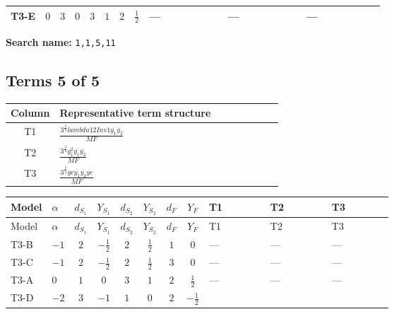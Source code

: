 \documentclass[8pt]{article}
\begin{document}
\begin{landscape}
\begin{longtable}{@{}llcccccc >{\raggedright\arraybackslash}p{0.21\linewidth} >{\raggedright\arraybackslash}p{0.21\linewidth} >{\raggedright\arraybackslash}p{0.21\linewidth}@{}}
\midrule
T3-E & $0$ & $3$ & $0$ & $3$ & $1$ & $2$ & $\frac{1}{2}$ & --- & --- & --- \\
\midrule
\bottomrule
\end{longtable}
\clearpage
\noindent\textbf{Search name: }\texttt{1,1,5,11}\par\smallskip
\subsection*{Terms 5 of 5}
\begin{center}
\begin{tabular}{@{}c >{\raggedright\arraybackslash}p{0.82\linewidth}@{}}
\toprule
Column & Representative term structure \\
\midrule
T1 & \(\displaystyle \frac{3^{\frac{3}{4}} lambda12Inv1 \overline{y_{1}} \overline{y_{2}}}{MF}\) \\
\midrule
T2 & \(\displaystyle \frac{3^{\frac{3}{4}} g_{1}^{2} \overline{y_{1}} \overline{y_{2}}}{MF}\) \\
\midrule
T3 & \(\displaystyle \frac{3^{\frac{3}{4}} ye \overline{y_{1}} \overline{y_{2}} \overline{ye}}{MF}\) \\
\midrule
\bottomrule
\end{tabular}
\end{center}
\smallskip
\tiny
\begin{longtable}{@{}llcccccc >{\raggedright\arraybackslash}p{0.21\linewidth} >{\raggedright\arraybackslash}p{0.21\linewidth} >{\raggedright\arraybackslash}p{0.21\linewidth}@{}}
\toprule
Model & $\alpha$ & $d_{S_1}$ & $Y_{S_1}$ & $d_{S_2}$ & $Y_{S_2}$ & $d_F$ & $Y_F$ & T1 & T2 & T3 \\
\midrule
\endfirsthead
\toprule
Model & $\alpha$ & $d_{S_1}$ & $Y_{S_1}$ & $d_{S_2}$ & $Y_{S_2}$ & $d_F$ & $Y_F$ & T1 & T2 & T3 \\
\midrule
\endhead
T3-B & $-1$ & $2$ & $-\frac{1}{2}$ & $2$ & $\frac{1}{2}$ & $1$ & $0$ & --- & --- & --- \\
\midrule
T3-C & $-1$ & $2$ & $-\frac{1}{2}$ & $2$ & $\frac{1}{2}$ & $3$ & $0$ & --- & --- & --- \\
\midrule
T3-A & $0$ & $1$ & $0$ & $3$ & $1$ & $2$ & $\frac{1}{2}$ & --- & --- & --- \\
\midrule
T3-D & $-2$ & $3$ & $-1$ & $1$ & $0$ & $2$ & $-\frac{1}{2}$ & \scriptsize\adjustbox{max width=\linewidth}{$\begin{gathered} - \frac{3^{\frac{3}{4}} lambda12Inv1 \overline{y_{1}} \overline{y_{2}}}{6 MF}\end{gathered}$} & \scriptsize\adjustbox{max width=\linewidth}{$\begin{gathered} - \frac{3^{\frac{3}{4}} g_{1}^{2} \overline{y_{1}} \overline{y_{2}}}{8 MF}\end{gathered}$} & \scriptsize\adjustbox{max width=\linewidth}{$\begin{gathered} \frac{3^{\frac{3}{4}} ye \overline{y_{1}} \overline{y_{2}} \overline{ye}}{12 MF}\end{gathered}$} \\

\end{longtable}
\end{landscape}
\end{document}
